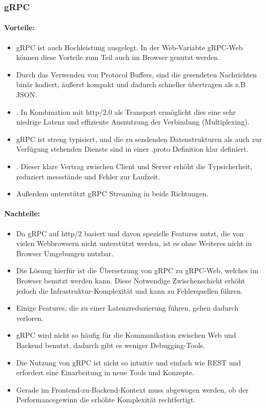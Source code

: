 \subsubsection{gRPC}

\paragraph{Vorteile:}
\begin{itemize}
	\item gRPC ist auch Hochleistung ausgelegt. In der Web-Variabte gRPC-Web können diese Vorteile zum Teil auch im Browser genutzt werden. 
	\item Durch das Verwenden von Protocol Buffers, sind die gesendeten Nachrichten binär kodiert, äußerst kompakt und dadurch schneller übertragen als z.B. JSON. 
	\item . In Kombination mit http/2.0 als Transport ermöglicht dies eine sehr niedrige Latenz und effiziente Ausnutzung der Verbindung (Multiplexing). 
	\item gRPC ist streng typisiert, und die zu sendenden Datenstrukturen als auch zur Verfügung stehenden Dienste sind in einer .proto Definition klar definiert. 
	\item . Dieser klare Vertrag zwischen Client und Server erhöht die Typsicherheit, reduziert messstände und Fehler zur Laufzeit.
	\item Außerdem unterstützt gRPC Streaming in beide Richtungen. 
\end{itemize}

\paragraph{Nachteile:}
\begin{itemize}
	\item Da gRPC auf http/2 basiert und davon spezielle Features nutzt, die von vielen Webbrowsern nicht unterstützt werden, ist es ohne Weiteres nicht in Browser Umgebungen nutzbar. 
	\item Die Lösung hierfür ist die Übersetzung von gRPC zu gRPC-Web, welches im Browser benutzt werden kann. Diese Notwendige Zwischenschicht erhöht jedoch die Infrastruktur-Komplexität und kann zu Fehlerquellen führen.
	\item Einige Features, die zu einer Latenzreduzierung führen, gehen dadurch verloren.
	\item gRPC wird nicht so häufig für die Kommunikation zwischen Web und Backend benutzt, dadurch gibt es weniger Debugging-Tools.
	\item Die Nutzung von gRPC ist nicht so intuitiv und einfach wie REST und erfordert eine Einarbeitung in neue Tools und Konzepte.
	\item Gerade im Frontend-zu-Backend-Kontext muss abgewogen werden, ob der Performancegewinn die erhöhte Komplexität rechtfertigt.
\end{itemize}

